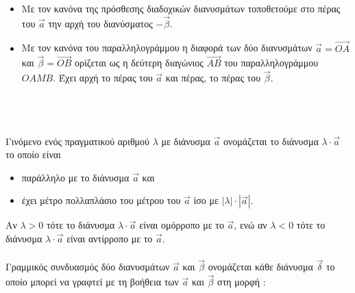 \documentclass[twoside,nofonts,internet,shmeiwseis]{thewria}
\begin{document}
\begin{itemize}[itemsep=0mm]
\item Με τον κανόνα της πρόσθεσης διαδοχικών διανυσμάτων τοποθετούμε στο πέρας του $ \vec{a} $ την αρχή του διανύσματος $ -\vec{\beta} $.
\item Με τον κανόνα του παραλληλογράμμου η διαφορά των δύο διανυσμάτων $ \vec{a}=\overrightarrow{OA} $ και $ \vec{\beta}=\overrightarrow{OB} $ ορίζεται ως η δεύτερη διαγώνιος $ \overrightarrow{AB} $ του παραλληλογράμμου $ OAMB $. Έχει αρχή το πέρας του $ \vec{a} $ και πέρας, το πέρας του $ \vec{\beta} $.
\end{itemize}
\mbox{}\\\\\\
Γινόμενο ενός πραγματικού αριθμού $ \lambda $ με διάνυσμα $ \vec{a} $ ονομάζεται το διάνυσμα $ \lambda\cdot\vec{a} $ το οποίο είναι 
\begin{itemize}[itemsep=0mm]
\item παράλληλο με το διάνυσμα $ \vec{a} $ και
\item έχει μέτρο πολλαπλάσιο του μέτρου του $ \vec{a} $ ίσο με $ |\lambda|\cdot|\vec{a}| $.
\end{itemize}
Αν $ \lambda>0 $ τότε το διάνυσμα $ \lambda\cdot\vec{a} $ είναι ομόρροπο με το $ \vec{a} $, ενώ αν $ \lambda<0 $ τότε το διάνυσμα $ \lambda\cdot\vec{a} $ είναι αντίρροπο με το $ \vec{a} $.\\\\
Γραμμικός συνδυασμός δύο διανυσμάτων $ \vec{a} $ και $ \vec{\beta} $ ονομάζεται κάθε διάνυσμα $ \vec{\delta} $ το οποίο μπορεί να γραφτεί με τη βοήθεια των $ \vec{a} $ και $ \vec{\beta} $ στη μορφή :
\end{document}

